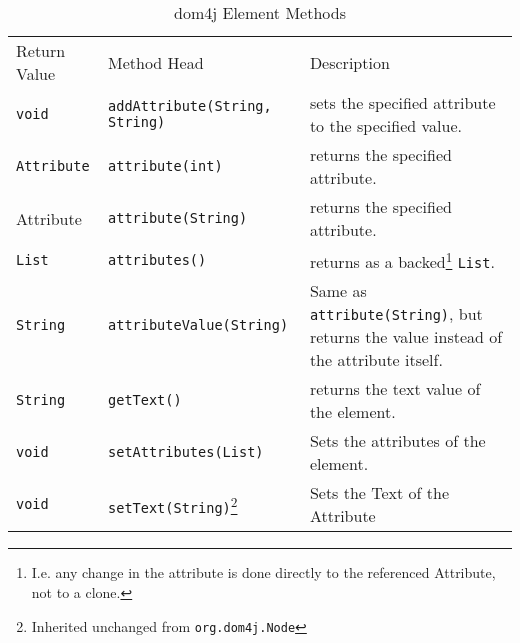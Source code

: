 \begin{table}[htbp]
	\centering
		\begin{tabular}{lll}
			Return Value & Method Head & Description \\
			\texttt{void} & \texttt{addAttribute(String, String)} & sets the specified attribute to the specified value.\\
			\texttt{Attribute} & \texttt{attribute(int)} & returns the specified attribute.\\
			\ttfamily Attribute & \texttt{attribute(String)} & returns the specified attribute.\\
			\texttt{List} & \texttt{attributes()} & returns as a backed\footnote{I.e. any change in the attribute is 
			  done directly to the referenced Attribute, not to a clone.} \texttt{List}.\\
			\texttt{String} & \texttt{attributeValue(String)} & Same as \texttt{attribute(String)}, but returns the value instead of the attribute itself.\\
			\texttt{String} & \texttt{getText()} & returns the text value of the element.\\
			\texttt{void} & \texttt{setAttributes(List)} & Sets the attributes of the element.\\
			\texttt{void} & \texttt{setText(String)}\footnote{Inherited unchanged from \texttt{org.dom4j.Node}} & Sets the Text of the Attribute\\
			
			  
		\end{tabular}
	\caption{dom4j Element Methods}
	\label{tab:dom4jElementMethods}
\end{table}